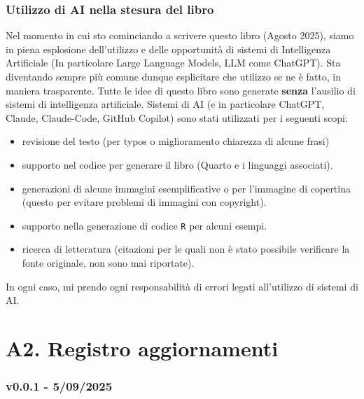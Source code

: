 \documentclass[
  italian,
  letterpaper,
  paper=A4,
  headinclude=on,
  footinclude=on,
  12pt]{scrbook}
\providecommand{\tightlist}{%
  \setlength{\itemsep}{0pt}\setlength{\parskip}{0pt}}
\begin{document}
\subsection*{Utilizzo di AI nella stesura del
libro}\label{utilizzo-di-ai-nella-stesura-del-libro}

Nel momento in cui sto cominciando a scrivere questo libro (Agosto
2025), siamo in piena esplosione dell'utilizzo e delle opportunità di
sistemi di Intelligenza Artificiale (In particolare Large Language
Models, LLM come ChatGPT). Sta diventando sempre più comune dunque
esplicitare che utilizzo se ne è fatto, in maniera trasparente. Tutte le
idee di questo libro sono generate \textbf{senza} l'ausilio di sistemi
di intelligenza artificiale. Sistemi di AI (e in particolare ChatGPT,
Claude, Claude-Code, GitHub Copilot) sono stati utilizzati per i
seguenti scopi:

\begin{itemize}
\tightlist
\item
  revisione del testo (per typos o miglioramento chiarezza di alcune
  frasi)
\item
  supporto nel codice per generare il libro (Quarto e i linguaggi
  associati).
\item
  generazioni di alcune immagini esemplificative o per l'immagine di
  copertina (questo per evitare problemi di immagini con copyright).
\item
  supporto nella generazione di codice \texttt{R} per alcuni esempi.
\item
  ricerca di letteratura (citazioni per le quali non è stato possibile
  verificare la fonte originale, non sono mai riportate).
\end{itemize}

In ogni caso, mi prendo ogni responsabilità di errori legati
all'utilizzo di sistemi di AI.

\chapter*{A2. Registro aggiornamenti}\label{registro_aggiornamenti}


\subsection*{v0.0.1 - 5/09/2025}\label{v0.0.1---5092025}
\end{document}

